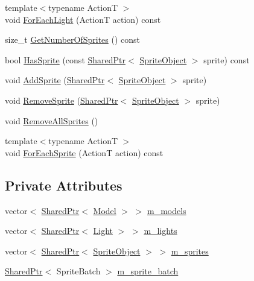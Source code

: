 \begin{DoxyCompactItemize}
\item 
{\footnotesize template$<$typename ActionT $>$ }\\void \hyperlink{classmage_1_1_world_a7f6e04d24be88ae3126021d1b935ef72}{For\+Each\+Light} (ActionT action) const
\item 
size\+\_\+t \hyperlink{classmage_1_1_world_a1223114c4cd4c231ed896682d37c6593}{Get\+Number\+Of\+Sprites} () const
\item 
bool \hyperlink{classmage_1_1_world_ae4a5abbdb2267c75e62f8ec666d9434c}{Has\+Sprite} (const \hyperlink{namespacemage_a1e01ae66713838a7a67d30e44c67703e}{Shared\+Ptr}$<$ \hyperlink{classmage_1_1_sprite_object}{Sprite\+Object} $>$ sprite) const
\item 
void \hyperlink{classmage_1_1_world_aee109cf9fab0a688507b4faca7a69beb}{Add\+Sprite} (\hyperlink{namespacemage_a1e01ae66713838a7a67d30e44c67703e}{Shared\+Ptr}$<$ \hyperlink{classmage_1_1_sprite_object}{Sprite\+Object} $>$ sprite)
\item 
void \hyperlink{classmage_1_1_world_a78bb790257c3a03ccb6829859230b4c7}{Remove\+Sprite} (\hyperlink{namespacemage_a1e01ae66713838a7a67d30e44c67703e}{Shared\+Ptr}$<$ \hyperlink{classmage_1_1_sprite_object}{Sprite\+Object} $>$ sprite)
\item 
void \hyperlink{classmage_1_1_world_a47f677ad48d834b89ff29c9c1a82dd9f}{Remove\+All\+Sprites} ()
\item 
{\footnotesize template$<$typename ActionT $>$ }\\void \hyperlink{classmage_1_1_world_aa81817e1ebc34170d255e2efef1f3134}{For\+Each\+Sprite} (ActionT action) const
\end{DoxyCompactItemize}
\subsection*{Private Attributes}
\begin{DoxyCompactItemize}
\item 
vector$<$ \hyperlink{namespacemage_a1e01ae66713838a7a67d30e44c67703e}{Shared\+Ptr}$<$ \hyperlink{classmage_1_1_model}{Model} $>$ $>$ \hyperlink{classmage_1_1_world_ad69d681d960e32f62800bfcfa88d7737}{m\+\_\+models}
\item 
vector$<$ \hyperlink{namespacemage_a1e01ae66713838a7a67d30e44c67703e}{Shared\+Ptr}$<$ \hyperlink{classmage_1_1_light}{Light} $>$ $>$ \hyperlink{classmage_1_1_world_a5010756f3403c5f0f9ed7120a83da3f6}{m\+\_\+lights}
\item 
vector$<$ \hyperlink{namespacemage_a1e01ae66713838a7a67d30e44c67703e}{Shared\+Ptr}$<$ \hyperlink{classmage_1_1_sprite_object}{Sprite\+Object} $>$ $>$ \hyperlink{classmage_1_1_world_a2c769aca9f3394dc0f41473c5cd342a9}{m\+\_\+sprites}
\item 
\hyperlink{namespacemage_a1e01ae66713838a7a67d30e44c67703e}{Shared\+Ptr}$<$ Sprite\+Batch $>$ \hyperlink{classmage_1_1_world_abb5d26cbfbd7b5792a53359b823c9f37}{m\+\_\+sprite\+\_\+batch}
\end{DoxyCompactItemize}


